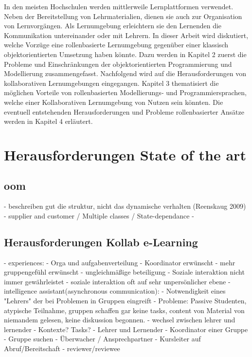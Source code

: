 \documentclass[conference]{IEEEtran}
\begin{document}
In den meisten Hochschulen werden mittlerweile Lernplattformen verwendet. Neben der Bereitstellung von Lehrmaterialien, dienen sie auch zur Organisation von Lernvorgängen. Als Lernumgebung erleichtern sie den Lernenden die Kommunikation untereinander oder mit Lehrern. 
In dieser Arbeit wird diskutiert, welche Vorzüge eine rollenbasierte Lernumgebung gegenüber einer klassisch objektorientierten Umsetzung haben könnte. Dazu werden in Kapitel 2 zuerst die Probleme und Einschränkungen der objektorientierten Programmierung und Modellierung zusammengefasst. Nachfolgend wird auf die Herausforderungen von kollaborativen Lernumgebungen eingegangen. Kapitel 3 thematisiert die möglichen Vorteile von rollenbasierten Modellierungs- und Programmiersprachen, welche einer Kollaborativen Lernumgebung von Nutzen sein könnten. Die eventuell entstehenden Herausforderungen und Probleme rollenbasierter Ansätze werden in Kapitel 4 erläutert.



\section{Herausforderungen State of the art}
\subsection{oom}
- beschreiben gut die struktur, nicht das dynamische verhalten (Reenskaug 2009)
- supplier and customer / Multiple classes / State-dependance
- 
\subsection{Herausforderungen Kollab e-Learning}
- experiences: 
	- Orga und aufgabenverteilung
	- Koordinator erwünscht
	- mehr gruppengefühl erwünscht
	- ungleichmäßige beteiligung
- Soziale interaktion nicht immer gewährleistet
	- soziale interaktion oft auf sehr unpersönlicher ebene
- intelligence assistant(asynchronous communication):
	- Notwendigkeit eines "Lehrers" der bei Problemen in Gruppen eingreift
		- Probleme: Passive Studenten, atypische Teilnahme, gruppen schaffen gar keine tasks, content von Material von niemandem gelesen, keine diskussion begonnen.
- wechsel zwischen lehrer und lernender
- Kontexte? Tasks?  
	- Lehrer und Lernender
	- Koordinator einer Gruppe
	- Gruppe suchen
	- Überwacher / Ansprechpartner
	- Kursleiter auf Abruf/Bereitschaft
	- reviewer/reviewee
\end{document}
